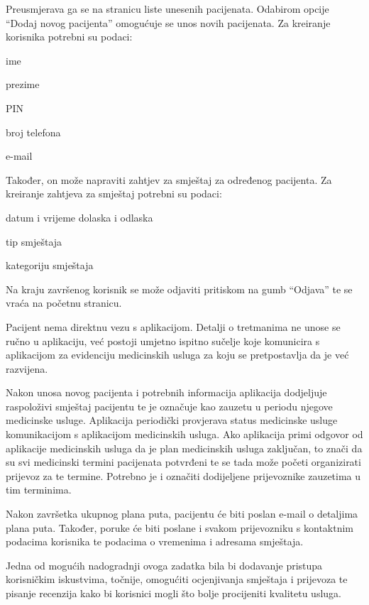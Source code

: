 		\noindent Preusmjerava ga se na stranicu liste unesenih pacijenata. Odabirom opcije “Dodaj novog pacijenta” omogućuje se unos novih pacijenata. Za kreiranje korisnika potrebni su podaci:

		\begin{packed_item}
			\item ime
			\item prezime
			\item PIN
			\item broj telefona
			\item e-mail
		\end{packed_item}
		
		\noindent Također, on može napraviti zahtjev za smještaj za određenog pacijenta. Za kreiranje zahtjeva za smještaj potrebni su podaci:
		\begin{packed_item}
			\item datum i vrijeme dolaska i odlaska
			\item tip smještaja
			\item kategoriju smještaja 
		\end{packed_item}
		
		\noindent Na kraju završenog korisnik se može odjaviti pritiskom na gumb “Odjava” te se vraća na početnu stranicu. 
		
		Pacijent nema direktnu vezu s aplikacijom. Detalji o tretmanima ne unose se ručno u aplikaciju, već postoji umjetno ispitno sučelje koje komunicira s aplikacijom za evidenciju medicinskih usluga za koju se pretpostavlja da je već razvijena.  
		
		Nakon unosa novog pacijenta i potrebnih informacija aplikacija dodjeljuje raspoloživi smještaj pacijentu te je označuje kao zauzetu u periodu njegove medicinske usluge. Aplikacija periodički provjerava status medicinske usluge komunikacijom s aplikacijom medicinskih usluga. Ako aplikacija primi odgovor od aplikacije medicinskih usluga da je plan medicinskih usluga zaključan, to znači da su svi medicinski termini pacijenata potvrđeni te se tada može početi organizirati prijevoz za te termine. Potrebno je i označiti dodijeljene prijevoznike zauzetima u tim terminima. 
		
		Nakon završetka ukupnog plana puta, pacijentu će biti poslan e-mail o detaljima plana puta. Također, poruke će biti poslane i svakom prijevozniku s kontaktnim podacima korisnika te podacima o vremenima i adresama smještaja. 
		
		Jedna od mogućih nadogradnji ovoga zadatka bila bi dodavanje pristupa korisničkim iskustvima, točnije, omogućiti ocjenjivanja smještaja i prijevoza te pisanje recenzija kako bi korisnici mogli što bolje procijeniti kvalitetu usluga.  
		
		\eject
		
	
		
	